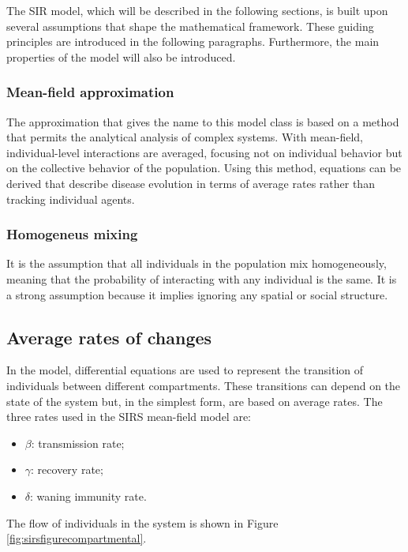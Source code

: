 The SIR model, which will be described in the following sections, is built upon several assumptions that shape the mathematical framework. These guiding principles are introduced in the following paragraphs. Furthermore, the main properties of the model will also be introduced. 

\subsubsection{Mean-field approximation}
The approximation that gives the name to this model class is based on a method that permits the analytical analysis of complex systems. With mean-field, individual-level interactions are averaged, focusing not on individual behavior but on the collective behavior of the population. Using this method, equations can be derived that describe disease evolution in terms of average rates rather than tracking individual agents.
\subsubsection{Homogeneus mixing} 
It is the assumption that all individuals in the population mix homogeneously, meaning that the probability of interacting with any individual is the same. It is a strong assumption because it implies ignoring any spatial or social structure.
\subsection{Average rates of changes}
\label{sec:sir_presentation}
In the model, differential equations are used to represent the transition of individuals between different compartments. These transitions can depend on the state of the system but, in the simplest form, are based on average rates. The three rates used in the SIRS mean-field model are:
\begin{itemize}
	\item $\beta$: transmission rate;
	\item $\gamma$: recovery rate;
	\item $\delta$: waning immunity rate.
\end{itemize}
The flow of individuals in the system is shown in Figure \ref{fig:sirsfigurecompartmental}.

